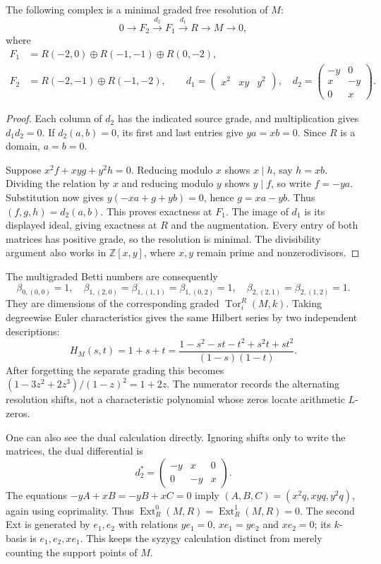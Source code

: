 \begin{theorem}\label{pers:resolution}
The following complex is a minimal graded free resolution of $M$:
\[
 0\longrightarrow F_2\xrightarrow{d_2}F_1\xrightarrow{d_1}R
       \longrightarrow M\longrightarrow0,
\]
where
\[
 \begin{split}
 F_1&=R(-2,0)\oplus R(-1,-1)\oplus R(0,-2),\\
 F_2&=R(-2,-1)\oplus R(-1,-2),\qquad
 d_1=\begin{pmatrix}x^2&xy&y^2\end{pmatrix},\quad
 d_2=\begin{pmatrix}-y&0\\x&-y\\0&x\end{pmatrix}.
 \end{split}
\]
\end{theorem}
\begin{proof}
Each column of $d_2$ has the indicated source grade, and multiplication
gives $d_1d_2=0$. If $d_2(a,b)=0$, its first and last entries give
$ya=xb=0$. Since $R$ is a domain, $a=b=0$.

Suppose $x^2f+xyg+y^2h=0$. Reducing modulo $x$ shows $x\mid h$,
say $h=xb$. Dividing the relation by $x$ and reducing modulo $y$
shows $y\mid f$, so write $f=-ya$. Substitution now gives
$y(-xa+g+yb)=0$, hence $g=xa-yb$. Thus
$(f,g,h)=d_2(a,b)$. This proves exactness at $F_1$. The image of
$d_1$ is its displayed ideal, giving exactness at $R$ and the
augmentation. Every entry of both matrices has positive grade, so the
resolution is minimal. The divisibility argument also works in
$\mathbb Z[x,y]$, where $x,y$ remain prime and nonzerodivisors.
\end{proof}

The multigraded Betti numbers are consequently
\[
 \beta_{0,(0,0)}=1,\quad
 \beta_{1,(2,0)}=\beta_{1,(1,1)}=\beta_{1,(0,2)}=1,\quad
 \beta_{2,(2,1)}=\beta_{2,(1,2)}=1.
\]
They are dimensions of the corresponding graded $\operatorname{Tor}^R_i(M,k)$.
Taking degreewise Euler characteristics gives the same Hilbert series by
two independent descriptions:
\[
 H_M(s,t)=1+s+t
 =\frac{1-s^2-st-t^2+s^2t+st^2}{(1-s)(1-t)}.
\]
After forgetting the separate grading this becomes
$(1-3z^2+2z^3)/(1-z)^2=1+2z$. The numerator records the alternating
resolution shifts, not a characteristic polynomial whose zeros locate
arithmetic $L$-zeros.

One can also see the dual calculation directly. Ignoring shifts only to
write the matrices, the dual differential is
\[
 d_2^*=\begin{pmatrix}-y&x&0\\0&-y&x\end{pmatrix}.
\]
The equations $-yA+xB=-yB+xC=0$ imply
$(A,B,C)=(x^2q,xyq,y^2q)$, again using coprimality. Thus
$\operatorname{Ext}^0_R(M,R)=\operatorname{Ext}^1_R(M,R)=0$.
The second Ext is generated by $e_1,e_2$ with relations
$ye_1=0$, $xe_1=ye_2$ and $xe_2=0$; its $k$-basis is
$e_1,e_2,xe_1$. This keeps the syzygy calculation distinct from merely
counting the support points of $M$.

